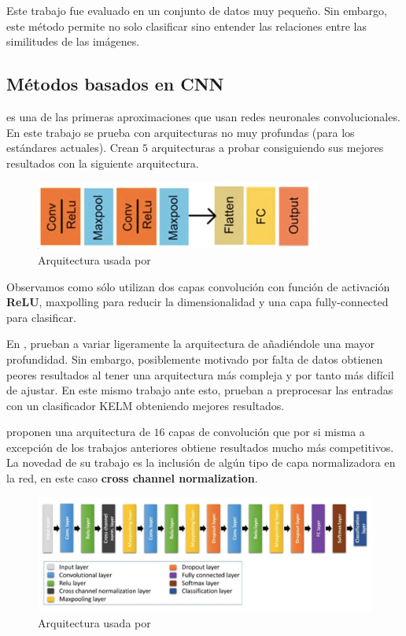 Este trabajo fue evaluado en un conjunto de datos muy pequeño. Sin embargo, este método permite no solo clasificar sino entender las relaciones entre las similitudes de las imágenes.

\subsection{Métodos basados en CNN}

\cite{abiwinanda2019brain} es una de las primeras aproximaciones que usan redes neuronales convolucionales. En este trabajo se prueba con arquitecturas no muy profundas (para los estándares actuales). Crean $5$ arquitecturas a probar consiguiendo sus mejores resultados con la siguiente arquitectura.

\begin{figure}[H]
	\centering
	\includegraphics[width=0.5\linewidth]{imagenes/abiwinanda2019brain.png}
	\caption{Arquitectura usada por \cite{abiwinanda2019brain}}
\end{figure}

Observamos como sólo utilizan dos capas convolución con función de activación \textbf{ReLU}, maxpolling para reducir la dimensionalidad y una capa fully-connected para clasificar.

En \cite{pashaei2018brain}, prueban a variar ligeramente la arquitectura de \cite{abiwinanda2019brain} añadiéndole una mayor profundidad. Sin embargo, posiblemente motivado por falta de datos obtienen peores resultados al tener una arquitectura más compleja y por tanto más difícil de ajustar. En este mismo trabajo ante esto, prueban a preprocesar las entradas con un clasificador KELM obteniendo mejores resultados.

\cite{sultan2019multi} proponen una arquitectura de $16$ capas de convolución que por si misma a excepción de los trabajos anteriores obtiene resultados mucho más competitivos. La novedad de su trabajo es la inclusión de algún tipo de capa normalizadora en la red, en este caso \textbf{cross channel normalization}. 

\begin{figure}[H]
	\centering
	\includegraphics[width=1.0\linewidth]{imagenes/sultan2019multi.png}
	\caption{Arquitectura usada por \cite{sultan2019multi}}
\end{figure}

